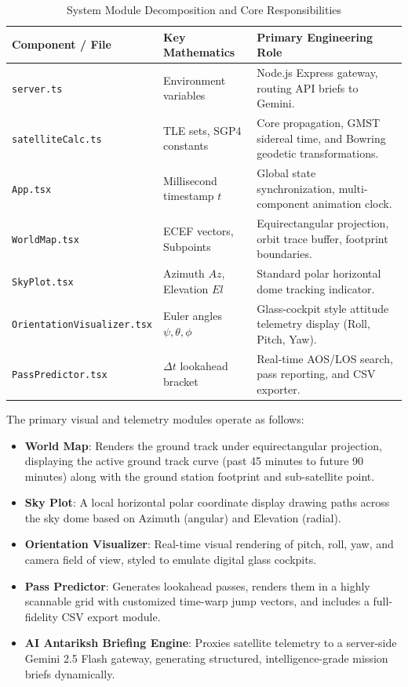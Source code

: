 \documentclass[11pt,journal,onecolumn]{IEEEtran}
\begin{document}
\begin{table}[htbp]
\centering
\caption{System Module Decomposition and Core Responsibilities}
\label{tab:architecture}
\small
\begin{tabular}{p{4.2cm}p{3.5cm}p{7.8cm}}
\toprule
\textbf{Component / File} & \textbf{Key Mathematics} & \textbf{Primary Engineering Role} \\
\midrule
\texttt{server.ts} & Environment variables & Node.js Express gateway, routing API briefs to Gemini. \\
\texttt{satelliteCalc.ts} & TLE sets, SGP4 constants & Core propagation, GMST sidereal time, and Bowring geodetic transformations. \\
\texttt{App.tsx} & Millisecond timestamp $t$ & Global state synchronization, multi-component animation clock. \\
\texttt{WorldMap.tsx} & ECEF vectors, Subpoints & Equirectangular projection, orbit trace buffer, footprint boundaries. \\
\texttt{SkyPlot.tsx} & Azimuth $Az$, Elevation $El$ & Standard polar horizontal dome tracking indicator. \\
\texttt{OrientationVisualizer.tsx} & Euler angles $\psi, \theta, \phi$ & Glass-cockpit style attitude telemetry display (Roll, Pitch, Yaw). \\
\texttt{PassPredictor.tsx} & $\Delta t$ lookahead bracket & Real-time AOS/LOS search, pass reporting, and CSV exporter. \\
\bottomrule
\end{tabular}
\end{table}

The primary visual and telemetry modules operate as follows:
\begin{itemize}
    \item \textbf{World Map}: Renders the ground track under equirectangular projection, displaying the active ground track curve (past 45 minutes to future 90 minutes) along with the ground station footprint and sub-satellite point.
    \item \textbf{Sky Plot}: A local horizontal polar coordinate display drawing paths across the sky dome based on Azimuth (angular) and Elevation (radial).
    \item \textbf{Orientation Visualizer}: Real-time visual rendering of pitch, roll, yaw, and camera field of view, styled to emulate digital glass cockpits.
    \item \textbf{Pass Predictor}: Generates lookahead passes, renders them in a highly scannable grid with customized time-warp jump vectors, and includes a full-fidelity CSV export module.
    \item \textbf{AI Antariksh Briefing Engine}: Proxies satellite telemetry to a server-side Gemini 2.5 Flash gateway, generating structured, intelligence-grade mission briefs dynamically.
\end{itemize}
\end{document}
